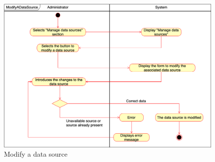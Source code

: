     \begin{figure}[h!]
        \centering
        \includegraphics[scale=0.35]{images/use_cases_diagram/administrator_modify_datasource.png}
        \caption{Modify a data source}
        \label{fig:administrator_modify_datasource}
    \end{figure}
    \FloatBarrier
   

